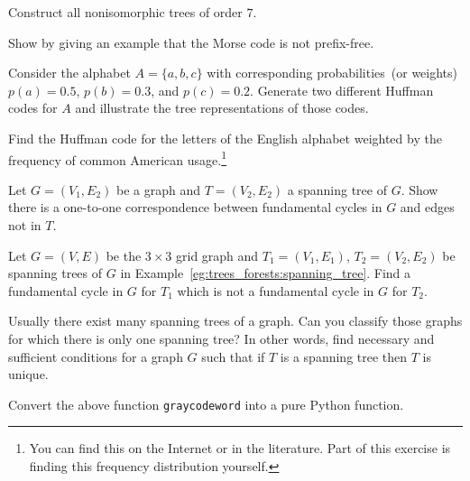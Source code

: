\begin{problem}
\item Construct all nonisomorphic trees of order $7$.

\item Show by giving an example that the Morse code is not
  prefix-free.

\item Consider the alphabet $A = \{a,b,c\}$ with corresponding
  probabilities~(or weights) $p(a) = 0.5$, $p(b) = 0.3$, and
  $p(c) = 0.2$. Generate two different Huffman codes for $A$ and
  illustrate the tree representations of those codes.

\item Find the Huffman code for the letters of the English alphabet
  weighted by the frequency of common American usage.\footnote{
    You can find this on the Internet or in the literature. Part of
    this exercise is finding this frequency distribution yourself.}

\item Let $G=(V_1,E_2)$ be a graph and $T=(V_2,E_2)$ a spanning tree
  of $G$. Show there is a one-to-one correspondence between
  fundamental cycles in $G$ and edges not in $T$.

\item Let $G=(V, E)$ be the $3\times 3$ grid graph and $T_1=(V_1,E_1)$,
  $T_2=(V_2,E_2)$ be spanning trees of $G$ in
  Example~\ref{eg:trees_forests:spanning_tree}. Find a fundamental
  cycle in $G$ for $T_1$ which is not a fundamental cycle in $G$ for
  $T_2$.

\item Usually there exist many spanning trees of a graph. Can you
  classify those graphs for which there is only one spanning tree? In
  other words, find necessary and sufficient conditions for a graph
  $G$ such that if $T$ is a spanning tree then $T$ is unique.

\item Convert the above function {\tt graycodeword} into a pure Python
  function.
\end{problem}
